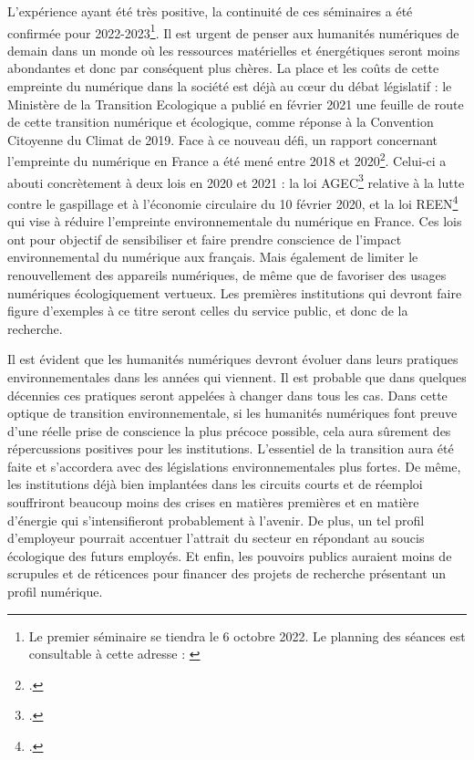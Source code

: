 \documentclass[a4paper,12pt,twoside]{book}
\begin{document}
 L'expérience ayant été très positive, la continuité de ces séminaires a été confirmée pour 2022-2023\footnote{Le premier séminaire se tiendra le 6 octobre 2022. Le planning des séances est consultable à cette adresse : \cite{reach-ngo}}. Il est urgent de penser aux humanités numériques de demain dans un monde où les ressources matérielles et énergétiques seront moins abondantes et donc par conséquent plus chères. La place et les coûts de  cette empreinte du numérique dans la société est déjà au c\oe{}ur du débat législatif : le Ministère de la Transition Ecologique a publié en février 2021
une feuille de route de cette transition numérique et écologique, comme réponse à la
Convention Citoyenne du Climat de 2019. Face à ce nouveau défi, un rapport concernant l'empreinte du numérique en France a été
mené entre 2018 et 2020\footcite{senat}. Celui-ci a abouti concrètement à deux lois en 2020 et 2021 : la loi AGEC\footcite{agec} relative à la lutte contre le gaspillage et à l'économie circulaire du 10 février 2020, et la loi REEN\footcite{reen} qui vise à réduire l'empreinte environnementale du numérique en France. Ces lois ont pour objectif de sensibiliser et faire prendre conscience de l'impact environnemental du numérique aux français. Mais également de limiter le renouvellement des appareils numériques, de même que de favoriser des usages numériques écologiquement vertueux. Les premières institutions qui devront faire figure d'exemples à ce titre seront celles du service public, et donc de la recherche.

Il est évident que les humanités numériques devront évoluer dans leurs pratiques environnementales dans les années qui viennent. Il est probable que dans quelques décennies ces pratiques seront appelées à changer dans tous les cas. Dans cette optique de transition environnementale, si les humanités numériques font preuve d'une réelle prise de conscience la plus précoce possible, cela aura sûrement des répercussions positives pour les institutions. L'essentiel de la transition aura été faite et s'accordera avec des législations environnementales plus fortes. De même, les institutions déjà bien implantées dans les circuits courts et de réemploi souffriront beaucoup moins des crises en matières premières et en matière d'énergie qui s'intensifieront probablement à l'avenir. De plus, un tel profil d'employeur pourrait accentuer l'attrait du secteur en répondant au soucis écologique des futurs employés. Et enfin, les pouvoirs publics auraient moins de scrupules et de réticences pour financer des projets de recherche présentant un profil numérique.
\end{document}
